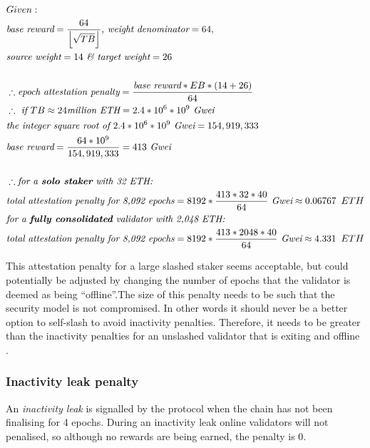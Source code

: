 \begin{equation*}
\begin{split}
& Given:\\
& \textit{base reward} = \frac{64}{ \left\lfloor \sqrt{TB} \right\rfloor} \textit{, weight denominator} = 64, \\
& \textit{source weight} = 14 \textit{  \& target weight} = 26\\
& \\
& \therefore \textit{epoch attestation penalty} = \frac{\textit{base reward} * EB * (14 + 26)}{64} \\
& \therefore \textit{ if } TB \approx 24 \textit{million ETH} = 2.4 * 10^6 * 10^9 \textit{ Gwei}\\
& \textit{the integer square root of } 2.4 * 10^6 * 10^9 \textit{ Gwei} = 154,919,333 \\
& \textit{base reward} = \frac{64 * 10^9}{154,919,333} = 413 \textit{ Gwei} \\
& \\
& \therefore \textit{for a \textbf{solo staker} with 32 ETH:} \\
& \textit{total attestation penalty for 8,092 epochs} = 8192 * \frac{413*32*40}{64}  \textit{ Gwei}  \approx 0.06767 \texttt{ } ETH \\
& \textit{for a \textbf{fully consolidated} validator with 2,048 ETH:} \\
& \textit{total attestation penalty for 8,092 epochs} = 8192 * \frac{413*2048*40}{64}  \textit{ Gwei}\approx 4.331 \texttt{ } ETH \\
\end{split}
\end{equation*}

This attestation penalty for a large slashed staker seems acceptable, but could potentially be adjusted by changing the number of epochs that the validator is deemed as being ``offline''.The size of this penalty needs to be such that the security model is not compromised. In other words it should never be a better option to self-slash to avoid inactivity penalties. Therefore, it needs to be greater than the inactivity penalties for an unslashed validator that is exiting and offline \cite{Neuder2023d}.

\subsubsection*{Inactivity leak penalty}
An \textit{inactivity leak} is signalled by the protocol when the chain has not been finalising for 4 epochs. During an inactivity leak online validators will not penalised, so although no rewards are being earned, the penalty is 0. 

